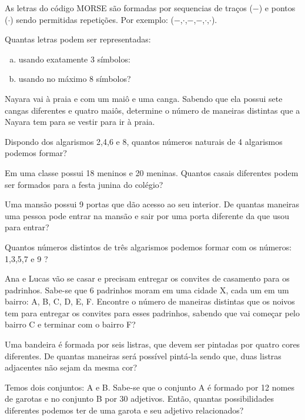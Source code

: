 	\item As letras do código MORSE são formadas por sequencias de traços ($-$) e pontos ($\cdot$) sendo permitidas repetições. Por exemplo: ($-$,$\cdot$,$-$,$-$,$\cdot$,$\cdot$).
	
	Quantas letras podem ser representadas:
	\begin{enumerate}[a)]
		\item usando exatamente 3 símbolos:
		\item usando no máximo 8 símbolos?
	\end{enumerate}	 
	
	\item Nayara vai à praia e com um maiô e uma canga. Sabendo que ela possui sete cangas diferentes e quatro maiôs, determine o número de maneiras distintas que a Nayara tem para se vestir para ir à praia.
	
	\item Dispondo dos algarismos 2,4,6 e 8, quantos números naturais de 4 algarismos podemos formar?
	
	\item Em uma classe possui 18 meninos e 20 meninas. Quantos casais diferentes podem ser formados para a festa junina do colégio?
	
	\item Uma mansão possui 9 portas que dão acesso ao seu interior. De quantas maneiras uma pessoa pode entrar na mansão e sair por uma porta diferente da que usou para entrar?
	
	\item Quantos números distintos de três algarismos podemos formar com os números: 1,3,5,7 e 9 ?
	
	\item Ana e Lucas vão se casar e precisam entregar os convites de casamento para os padrinhos. Sabe-se que 6 padrinhos moram em uma cidade X, cada um em um bairro: A, B, C, D, E, F. Encontre o número de maneiras distintas que os noivos tem para entregar os convites para esses padrinhos, sabendo que vai começar pelo bairro C e terminar com o bairro F?
	
	\item Uma bandeira é formada por seis listras, que devem ser pintadas por quatro cores diferentes. De quantas maneiras será possível pintá-la sendo que, duas listras adjacentes não sejam da mesma cor?
	
	\item Temos dois conjuntos: A e B. Sabe-se que o conjunto A é formado por 12 nomes de garotas e no conjunto B por 30 adjetivos. Então, quantas possibilidades diferentes podemos ter de uma garota e seu adjetivo relacionados?
	
